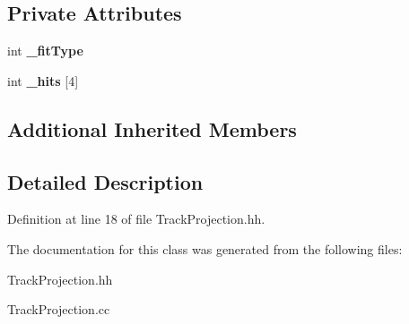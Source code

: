 \subsection*{Private Attributes}
\begin{DoxyCompactItemize}
\item 
int {\bfseries \-\_\-fit\-Type}\label{classTBTrack_1_1TrackProjection_ac62ce7e8caa0726293c426b63be9afb0}

\item 
int {\bfseries \-\_\-hits} [4]\label{classTBTrack_1_1TrackProjection_a68bc579b0e61af75267ac3cc3fa72663}

\end{DoxyCompactItemize}
\subsection*{Additional Inherited Members}


\subsection{Detailed Description}


Definition at line 18 of file Track\-Projection.\-hh.



The documentation for this class was generated from the following files\-:\begin{DoxyCompactItemize}
\item 
Track\-Projection.\-hh\item 
Track\-Projection.\-cc\end{DoxyCompactItemize}
